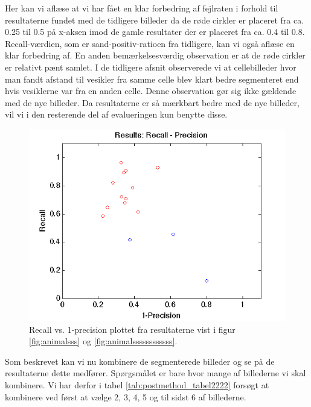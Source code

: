 Her kan vi aflæse at vi har fået en klar forbedring af fejlraten i forhold til resultaterne fundet med de tidligere billeder da de røde cirkler er placeret fra ca. 0.25 til 0.5 på x-aksen imod de gamle resultater der er placeret fra ca. 0.4 til 0.8. Recall-værdien, som er sand-positiv-ratioen fra tidligere, kan vi også aflæse en klar forbedring af. En anden bemærkelsesværdig observation er at de røde cirkler er relativt pænt samlet. I de tidligere afsnit observerede vi at cellebilleder hvor man fandt afstand til vesikler fra samme celle blev klart bedre segmenteret end hvis vesiklerne var fra en anden celle. Denne observation gør sig ikke gældende med de nye billeder. Da resultaterne er så mærkbart bedre med de nye billeder, vil vi i den resterende del af evalueringen kun benytte disse.

\begin{figure}[H]
	\centering
	\includegraphics[scale=0.9]{files/postmethod/img/recallvsprecision.png}
	\caption{Recall vs. 1-precision plottet fra resultaterne vist i figur \ref{fig:animalsss} og \ref{fig:animalssssssssssss}.\label{fig:postmethod_recallprec}}
\end{figure}

Som beskrevet kan vi nu kombinere de segmenterede billeder og se på de resultaterne dette medfører. Spørgsmålet er bare hvor mange af billederne vi skal kombinere. Vi har derfor i tabel \ref{tab:postmethod_tabel2222} forsøgt at kombinere ved først at vælge 2, 3, 4, 5 og til sidst 6 af billederne.

